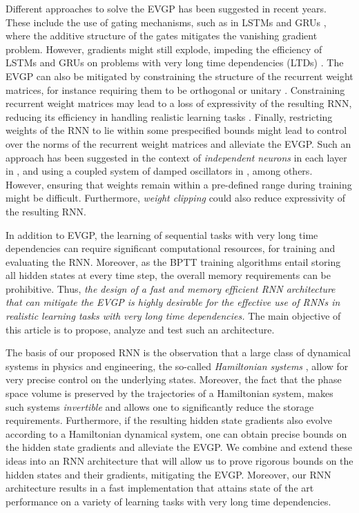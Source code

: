 \documentclass{article}
\begin{document}
Different approaches to solve the EVGP has been suggested in recent years. These include the use of gating mechanisms, such as in LSTMs \cite{lstm} and GRUs \cite{gru}, where the additive structure of the gates mitigates the vanishing gradient problem. However, gradients might still explode, impeding the efficiency of LSTMs and GRUs on problems with very long time dependencies (LTDs) \cite{indrnn}. The EVGP can also be mitigated by constraining the structure of the recurrent weight matrices, for instance requiring them to be orthogonal or unitary \citep{orthornn,urnn,eurnn,nnRNN}. Constraining recurrent weight matrices may lead to a loss of expressivity of the resulting RNN, reducing its efficiency in handling realistic learning tasks \cite{nnRNN}. Finally, restricting weights of the RNN to lie within some prespecified bounds might lead to control over the norms of the recurrent weight matrices and alleviate the EVGP. Such an approach has been suggested in the context of \emph{independent neurons} in each layer in \cite{indrnn}, and using a coupled system of damped oscillators in \cite{coRNN}, among others. However, ensuring that weights remain within a pre-defined range during training might be difficult. Furthermore, \emph{weight clipping} could also reduce expressivity of the resulting RNN. 

In addition to EVGP, the learning of sequential tasks with very long time dependencies can require significant computational resources, for training and evaluating the RNN. Moreover, as the BPTT training algorithms entail storing all hidden states at every time step, the overall memory requirements can be prohibitive. Thus, \emph{the design of a fast and memory efficient RNN architecture that can mitigate the EVGP is highly desirable for the effective use of RNNs in realistic learning tasks with very long time dependencies.} The main objective of this article is to propose, analyze and test such an architecture. 

The basis of our proposed RNN is the observation that a large class of dynamical systems in physics and engineering, the so-called \emph{Hamiltonian systems} \cite{arn1}, allow for very precise control on the underlying states. Moreover, the fact that the phase space volume is preserved by the trajectories of a Hamiltonian system, makes such systems \emph{invertible} and allows one to significantly reduce the storage requirements. Furthermore, if the resulting hidden state gradients also evolve according to a Hamiltonian dynamical system, one can obtain precise bounds on the hidden state gradients and alleviate the EVGP. We combine and extend these ideas into an RNN architecture that will allow us to prove rigorous bounds on the hidden states and their gradients, mitigating the EVGP. Moreover, our RNN architecture results in a fast implementation that attains state of the art performance on a variety of learning tasks with very long time dependencies. 
\end{document}
